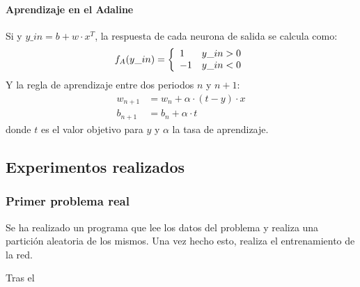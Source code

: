 \documentclass[spanish]{assignment}
\begin{document}
	\paragraph{Aprendizaje en el Adaline}\mbox{}
	
	Si y $y\_in = b + w\cdot x^T$, la respuesta de cada neurona de salida se calcula como:
	\begin{equation*}
		f_A(y\_in) = \left\{
		\begin{array}{l l}
			1 & y\_in > 0\\
			-1 & y\_in < 0\\
		\end{array}
		\right.
	\end{equation*}
	Y la regla de aprendizaje entre dos periodos $n$ y $n+1$:
	\begin{align*}
		w_{n+1} &= w_n + \alpha\cdot (t-y)\cdot x\\
		b_{n+1} &= b_n + \alpha\cdot t
	\end{align*}
	donde $t$ es el valor objetivo para $y$ y $\alpha$ la tasa de aprendizaje.
	
	\subsection{Experimentos realizados}
	\subsubsection{Primer problema real}
	Se ha realizado un programa que lee los datos del problema y realiza una partición aleatoria de los mismos. Una vez hecho esto, realiza el entrenamiento de la red.
	
	Tras el 
	
	
\end{document}
